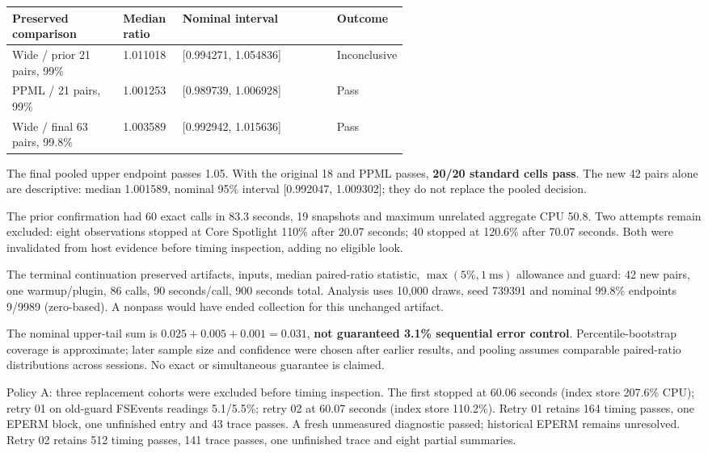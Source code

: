 \documentclass[11pt,letterpaper]{article}
\renewcommand{\arraystretch}{1.16}
\newcommand{\smallbody}{\fontsize{9.4}{11.65}\selectfont\color{Ink}\RaggedRight}
\newenvironment{compactleaf}{\setlength{\parskip}{2.5pt}\renewcommand{\arraystretch}{1.06}\renewcommand{\smallbody}{\fontsize{9.2}{11.1}\selectfont\color{Ink}\RaggedRight}\renewcommand{\sub}[1]{\par\vspace{2pt}{\sffamily\bfseries\fontsize{11.5}{14}\selectfont\color{Teal}##1\par}}\renewcommand{\tagline}[1]{{\sffamily\fontsize{9.5}{12}\selectfont\color{Muted}##1\par}\vspace{3pt}}}{}
\newcommand{\sub}[1]{\par\vspace{4pt}{\sffamily\bfseries\fontsize{11.5}{14}\selectfont\color{Teal}#1\par}\vspace{1pt}}
\newcommand{\tagline}[1]{{\sffamily\fontsize{9.5}{12}\selectfont\color{Muted}#1\par}\vspace{5pt}}
\begin{document}
\begin{compactleaf}
\begin{center}
\begin{tikzpicture}[x=1cm,y=0.70cm,font=\sffamily\fontsize{8.7}{10.6}\selectfont]
\end{tikzpicture}
\end{center}
{\smallbody
\begin{tabularx}{\linewidth}{P{0.29\linewidth}P{0.15\linewidth}Y P{0.13\linewidth}}
\toprule
\textbf{Preserved comparison} & \textbf{Median ratio} & \textbf{Nominal interval} & \textbf{Outcome}\\
\midrule
Wide / prior 21 pairs, 99\% & 1.011018 & [0.994271, 1.054836] & Inconclusive\\
PPML / 21 pairs, 99\% & 1.001253 & [0.989739, 1.006928] & Pass\\
Wide / final 63 pairs, 99.8\% & 1.003589 & [0.992942, 1.015636] & Pass\\
\bottomrule
\end{tabularx}
The final pooled upper endpoint passes 1.05. With the original 18 and PPML passes, \textbf{20/20 standard cells pass}. The new 42 pairs alone are descriptive: median 1.001589, nominal 95\% interval [0.992047, 1.009302]; they do not replace the pooled decision.

The prior confirmation had 60 exact calls in 83.3 seconds, 19 snapshots and maximum unrelated aggregate CPU 50.8. Two attempts remain excluded: eight observations stopped at Core Spotlight 110\% after 20.07 seconds; 40 stopped at 120.6\% after 70.07 seconds. Both were invalidated from host evidence before timing inspection, adding no eligible look.
}
\sub{Frozen terminal rule and confidence limits}
{\smallbody
The terminal continuation preserved artifacts, inputs, median paired-ratio statistic, $\max(5\%,1\ \mathrm{ms})$ allowance and guard: 42 new pairs, one warmup/plugin, 86 calls, 90 seconds/call, 900 seconds total. Analysis uses 10,000 draws, seed 739391 and nominal 99.8\% endpoints 9/9989 (zero-based). A nonpass would have ended collection for this unchanged artifact.

The nominal upper-tail sum is $0.025+0.005+0.001=0.031$, \textbf{not guaranteed 3.1\% sequential error control}. Percentile-bootstrap coverage is approximate; later sample size and confidence were chosen after earlier results, and pooling assumes comparable paired-ratio distributions across sessions. No exact or simultaneous guarantee is claimed.

Policy A: three replacement cohorts were excluded before timing inspection. The first stopped at 60.06 seconds (index store 207.6\% CPU); retry 01 on old-guard FSEvents readings 5.1/5.5\%; retry 02 at 60.07 seconds (index store 110.2\%). Retry 01 retains 164 timing passes, one EPERM block, one unfinished entry and 43 trace passes. A fresh unmeasured diagnostic passed; historical EPERM remains unresolved. Retry 02 retains 512 timing passes, 141 trace passes, one unfinished trace and eight partial summaries.

}
\end{compactleaf}
\end{document}
